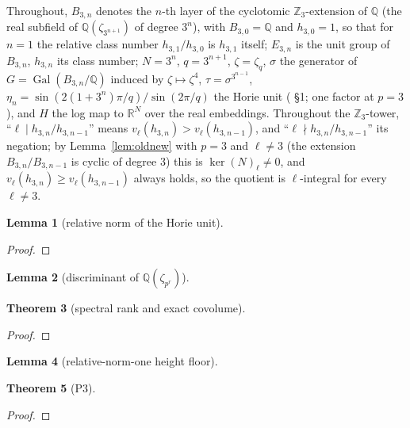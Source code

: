 \documentclass[11pt]{amsart}
\newtheorem{theorem}{Theorem}[section]
\newtheorem{lemma}[theorem]{Lemma}
\theoremstyle{remark}\newtheorem{remark}[theorem]{Remark}
\theoremstyle{definition}\newtheorem{definition}[theorem]{Definition}
\newcommand{\Q}{\mathbb{Q}}\newcommand{\Z}{\mathbb{Z}}\newcommand{\R}{\mathbb{R}}\newcommand{\F}{\mathbb{F}}
\providecommand{\proofsdir}{../../proofs} %
\begin{document}
Throughout, $B_{3,n}$ denotes the $n$-th layer of the cyclotomic $\Z_3$-extension of $\Q$ (the real subfield of $\Q(\zeta_{3^{n+1}})$ of degree $3^n$), with $B_{3,0}=\Q$ and $h_{3,0}=1$, so that for $n=1$ the relative class number $h_{3,1}/h_{3,0}$ is $h_{3,1}$ itself; $E_{3,n}$ is the unit group of $B_{3,n}$, $h_{3,n}$ its class number; $N=3^n$, $q=3^{n+1}$, $\zeta=\zeta_q$, $\sigma$ the generator of $G=\operatorname{Gal}(B_{3,n}/\Q)$ induced by $\zeta\mapsto\zeta^4$, $\tau=\sigma^{3^{n-1}}$, $\eta_n=\sin(2(1+3^n)\pi/q)/\sin(2\pi/q)$ the Horie unit (\cite{MO13} \S1; one factor at $p=3$), and $H$ the log map to $\R^{N}$ over the real embeddings. Throughout the $\Z_3$-tower, ``$\ell\mid h_{3,n}/h_{3,n-1}$'' means $v_\ell(h_{3,n})>v_\ell(h_{3,n-1})$, and ``$\ell\nmid h_{3,n}/h_{3,n-1}$'' its negation; by Lemma~\ref{lem:oldnew} with $p=3$ and $\ell\ne3$ (the extension $B_{3,n}/B_{3,n-1}$ is cyclic of degree $3$) this is $\ker(N)_\ell\ne0$, and $v_\ell(h_{3,n})\ge v_\ell(h_{3,n-1})$ always holds, so the quotient is $\ell$-integral for every $\ell\ne3$.
\begin{lemma}[relative norm of the Horie unit]\label{lem:normone}

\end{lemma}
\begin{proof}

\end{proof}
\begin{lemma}[discriminant of $\Q(\zeta_{p^r})$]\label{lem:disc}

\end{lemma}
\begin{theorem}[spectral rank and exact covolume]\label{thm:rank3}

\end{theorem}
\begin{proof}

\end{proof}
\begin{lemma}[relative-norm-one height floor]\label{lem:mo25-z3}

\end{lemma}
\begin{theorem}[P3]\label{thm:P3}

\end{theorem}
\begin{proof}

\end{proof}
\end{document}
